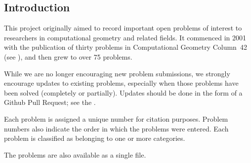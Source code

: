 \subsection{Introduction}
This project originally aimed to record important open problems
of interest to researchers in computational geometry and
related fields.  It commenced in 2001 with the publication of
thirty problems in Computational Geometry Column~42~\cite{mo-cgc42-01}
(see ),
and then grew to over 75 problems.

While we are no longer encouraging new problem submissions, we strongly
encourage updates to existing problems, especially when those problems have
been solved (completely or partially).
Updates should be done in the form of a Github Pull Request;
see the .

Each problem is assigned a unique number for citation purposes.
Problem numbers also indicate the order in which the problems were entered.
Each problem is classified as belonging to one or more categories.

The problems are also available as a single
file.

